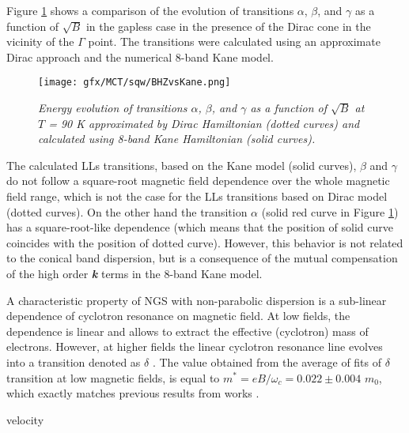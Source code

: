 \documentclass[titlepage,a4paper]{book}
\begin{document}
Figure \ref{fig:BHZvsKane} shows a comparison of the evolution of transitions $\alpha$, $\beta$, and $\gamma$ as a function of $\sqrt{B}$ in the gapless case in the presence of the Dirac cone in the vicinity of the $\Gamma$ point. The transitions were calculated using an approximate Dirac approach and the numerical 8-band Kane model. 
 

\begin{figure}[ht]
	\centering
	\texttt{[image: gfx/MCT/sqw/BHZvsKane.png]}
	\vspace{-10pt}
	\caption{\textit{Energy evolution of transitions $\alpha$, $\beta$, and $\gamma$ as a function of $\sqrt{B}$ at $T$ = 90 K approximated by Dirac Hamiltonian (dotted curves) and calculated using 8-band Kane Hamiltonian (solid curves).}}
	\label{fig:BHZvsKane}
\end{figure}

The calculated LLs transitions, based on the Kane model (solid curves), $\beta$ and $\gamma$ do not follow a square-root magnetic field dependence over the whole magnetic field range, which is not the case for the LLs transitions based on Dirac model (dotted curves). On the other hand the transition $\alpha$ (solid red curve in Figure \ref{fig:BHZvsKane}) has a square-root-like dependence (which means that the position of solid curve coincides with the position of dotted curve). However, this behavior is not related to the conical band dispersion, but is a consequence of the mutual compensation of the high order \textbf{\textit{k}} terms in the 8-band Kane model.

A characteristic property of NGS with non-parabolic dispersion is a sub-linear dependence of cyclotron resonance on magnetic field. At low fields, the dependence is linear and allows to extract the effective (cyclotron) mass of electrons. However, at higher fields the linear cyclotron resonance line evolves into a transition denoted as $\delta$ \cite{Orlita_MCT_QW}. The value obtained from the average of fits of $\delta$ transition at low magnetic fields, is equal to $m^* = eB/\omega_c = 0.022 \pm 0.004$ $m_0$, which exactly matches previous results from works \cite{Orlita_MCT_QW}\cite{Zholudev_MCT_QW}. 


velocity \cite{Ludwig_MCT_QW}
\end{document}
